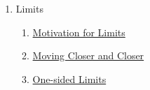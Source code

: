 \clearpage
\renewcommand{\notetitle}{Table of Contents}
\label{toc}
\begin{enumerate}

\item Limits
\begin{enumerate}
\item \hyperref[202501050700]{Motivation for Limits}
\item \hyperref[202501070739]{Moving Closer and Closer}
\item \hyperref[202501100655]{One-sided Limits}
\end{enumerate}
\end{enumerate}

\newpage
